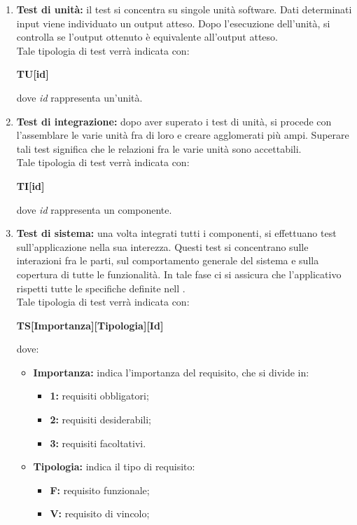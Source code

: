 \begin{enumerate}
	\item \textbf{Test di unità:} il test si concentra su singole unità software. Dati determinati input viene individuato un output atteso. Dopo l'esecuzione dell'unità, si controlla se l'output ottenuto è equivalente all'output atteso.\\
Tale tipologia di test verrà indicata con:
\begin{center}
	\textbf{TU[id]}
\end{center}
dove \textit{id} rappresenta un’unità.
	\item \textbf{Test di integrazione:} dopo aver superato i test di unità, si procede con l'assemblare le varie unità fra di loro e creare agglomerati più ampi. Superare tali test significa che le relazioni fra le varie unità sono accettabili.\\
Tale tipologia di test verrà indicata con:
\begin{center}
	\textbf{TI[id]}
\end{center}
dove \textit{id} rappresenta un componente.
	\item \textbf{Test di sistema:} una volta integrati tutti i componenti, si effettuano test sull'applicazione nella sua interezza. Questi test si concentrano sulle interazioni fra le parti, sul comportamento generale del sistema e sulla copertura di tutte le funzionalità. In tale fase ci si assicura che l'applicativo rispetti tutte le specifiche definite nell .\\
Tale tipologia di test verrà indicata con:
\begin{center}
	\textbf{TS[Importanza][Tipologia][Id]}
\end{center}
dove:
\begin{itemize}
	\item \textbf{Importanza:} indica l'importanza del requisito, che si divide in:
	\begin{itemize}
		\item \textbf{1:} requisiti obbligatori;
		\item \textbf{2:} requisiti desiderabili;
		\item \textbf{3:} requisiti facoltativi.
	\end{itemize}
	\item \textbf{Tipologia:} indica il tipo di requisito:
	\begin{itemize}
		\item \textbf{F:} requisito funzionale;
		\item \textbf{V:} requisito di vincolo;

\end{itemize}
\end{itemize}
\end{enumerate}
